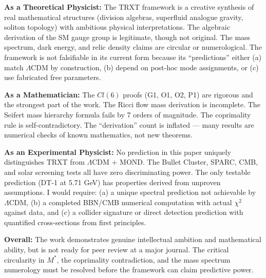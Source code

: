 \documentclass[12pt, a4paper]{article}
\begin{document}
\begin{tcolorbox}[colback=blue!5!white, colframe=blue!50!black, title=Verdict]
\textbf{As a Theoretical Physicist:} The TRXT framework is a creative synthesis of real mathematical structures (division algebras, superfluid analogue gravity, soliton topology) with ambitious physical interpretations. The algebraic derivation of the SM gauge group is legitimate, though not original. The mass spectrum, dark energy, and relic density claims are circular or numerological. The framework is not falsifiable in its current form because its ``predictions'' either (a) match $\Lambda$CDM by construction, (b) depend on post-hoc mode assignments, or (c) use fabricated free parameters.

\textbf{As a Mathematician:} The $Cl(6)$ proofs (G1, O1, O2, P1) are rigorous and the strongest part of the work. The Ricci flow mass derivation is incomplete. The Seifert mass hierarchy formula fails by 7 orders of magnitude. The coprimality rule is self-contradictory. The ``derivation'' count is inflated --- many results are numerical checks of known mathematics, not new theorems.

\textbf{As an Experimental Physicist:} No prediction in this paper uniquely distinguishes TRXT from $\Lambda$CDM + MOND. The Bullet Cluster, SPARC, CMB, and solar screening tests all have zero discriminating power. The only testable prediction (DT-1 at 5.71 GeV) has properties derived from unproven assumptions. I would require: (a) a unique spectral prediction not achievable by $\Lambda$CDM, (b) a completed BBN/CMB numerical computation with actual $\chi^2$ against data, and (c) a collider signature or direct detection prediction with quantified cross-sections from first principles.

\textbf{Overall:} The work demonstrates genuine intellectual ambition and mathematical ability, but is not ready for peer review at a major journal. The critical circularity in $M^*$, the coprimality contradiction, and the mass spectrum numerology must be resolved before the framework can claim predictive power.
\end{tcolorbox}
\end{document}
